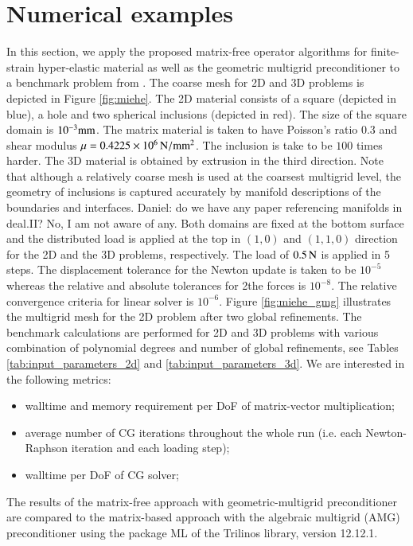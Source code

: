 \documentclass[preprint,12pt,times]{elsarticle}
\begin{document}
\section{Numerical examples}
\label{sec:example}

In this section, we apply the proposed matrix-free operator algorithms for finite-strain hyper-elastic material as well as the geometric multigrid preconditioner to a benchmark problem from \cite{Miehe2007}. The coarse mesh for 2D and 3D problems is depicted in Figure \ref{fig:miehe}. The 2D material consists of a square (depicted in blue), a hole and two spherical inclusions (depicted in red). The size of the square domain is $10^{-3} \rm{mm}$.
The matrix material is taken to have Poisson's ratio $0.3$ and shear modulus $\mu=0.4225 \times 10^6\, \rm{N/mm^2}$. The inclusion is take to be $100$ times harder.
The 3D material is obtained by extrusion in the third direction.
Note that although a relatively coarse mesh is used at the coarsest multigrid level, the geometry of inclusions is captured accurately by manifold descriptions of the boundaries and interfaces.
{\color{red}Daniel: do we have any paper referencing manifolds in deal.II? No, I am not aware of any.}
Both domains are fixed at the bottom surface and the distributed load is applied at the top in $(1,0)$ and $(1,1,0)$ direction for the 2D and the 3D problems, respectively.
The load of $0.5\,\rm{N}$ is applied in 5 steps. The displacement tolerance for the Newton update is taken to be $10^{-5}$ whereas the relative and absolute tolerances for 2the forces is $10^{-8}$. The relative convergence criteria for linear solver is $10^{-6}$.
%
Figure \ref{fig:miehe_gmg} illustrates the multigrid mesh for the 2D problem after two global refinements.
%
The benchmark calculations are performed for 2D and 3D problems with various combination of polynomial degrees and number of global refinements, see Tables \ref{tab:input_parameters_2d} and \ref{tab:input_parameters_3d}.
%
We are interested in the following metrics:
\begin{itemize}
\item walltime and memory requirement per DoF of matrix-vector multiplication;
\item average number of CG iterations throughout the whole run (i.e. each Newton-Raphson iteration and each loading step);
\item walltime per DoF of CG solver;
\end{itemize}
%
The results of the matrix-free approach with geometric-multigrid preconditioner are compared to the matrix-based approach with the algebraic multigrid (AMG) preconditioner using the package ML of the Trilinos \cite{Heroux2005} library, version 12.12.1.
\end{document}
